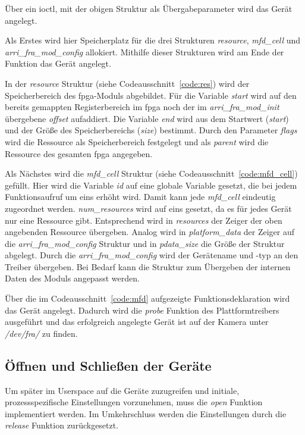 Über ein \ac{ioctl}, mit der obigen Struktur als Übergabeparameter wird das Gerät angelegt. 


Als Erstes wird hier Speicherplatz für die drei Strukturen \textit{resource}, \textit{mfd\_cell} und \textit{arri\_fra\_mod\_config} allokiert. Mithilfe dieser Strukturen wird am Ende der Funktion das Gerät angelegt.


In der \textit{resource} Struktur (siehe Codeausschnitt~\ref{code:res}) wird der Speicherbereich des \ac{fpga}-Moduls abgebildet. Für die Variable \textit{start} wird auf den bereits gemappten Registerbereich im \ac{fpga} noch der im \textit{arri\_fra\_mod\_init} übergebene \textit{offset} aufaddiert. Die Variable \textit{end} wird aus dem Startwert (\textit{start}) und der Größe des Speicherbereichs (\textit{size}) bestimmt. Durch den Parameter \textit{flags} wird die Ressource als Speicherbereich festgelegt und als \textit{parent} wird die Ressource des gesamten \ac{fpga} angegeben.


Als Nächstes wird die \textit{mfd\_cell} Struktur (siehe Codeausschnitt~\ref{code:mfd_cell}) gefüllt. Hier wird die Variable \textit{id} auf eine globale Variable gesetzt, die bei jedem Funktionsaufruf um eins erhöht wird. Damit kann jede \textit{mfd\_cell} eindeutig zugeordnet werden. \textit{num\_resources} wird auf eins gesetzt, da es für jedes Gerät nur eine Ressource gibt. Entsprechend wird in  \textit{resources} der Zeiger der oben angebenden Ressource übergeben. Analog wird in \textit{platform\_data} der Zeiger auf die \textit{arri\_fra\_mod\_config} Struktur und in \textit{pdata\_size} die Größe der Struktur abgelegt.
Durch die \textit{arri\_fra\_mod\_config} wird der Gerätename und -typ an den Treiber übergeben. Bei Bedarf kann die Struktur zum Übergeben der internen Daten des Moduls angepasst werden.

Über die im Codeausschnitt~\ref{code:mfd} aufgezeigte Funktionsdeklaration wird das Gerät angelegt. Dadurch wird die \textit{probe} Funktion des Plattformtreibers ausgeführt und das erfolgreich angelegte Gerät ist auf der Kamera unter \textit{/dev/fra/} zu finden.


\subsection{Öffnen und Schließen der Geräte}
Um später im Userspace auf die Geräte zuzugreifen und initiale, prozessspezifische Einstellungen vorzunehmen, muss die \textit{open} Funktion implementiert werden. Im Umkehrschluss werden die Einstellungen durch die \textit{release} Funktion zurückgesetzt. \cite[Seite 58f.]{corbet2005linux} \\

